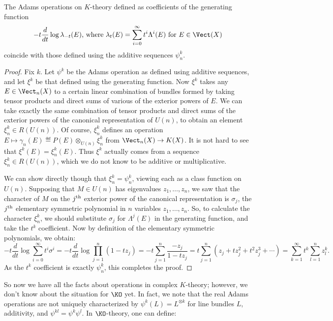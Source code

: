 \begin{claim}
The Adams operations on $K$-theory defined as coefficients of the generating function
\[-t \frac{d}{dt}\log \lambda_{-t}(E)\textup{, where }\lambda_t(E)=\sum_{i=0}^\infty t^i\Lambda^i(E)\text{ for } E\in\Vect(X)\]
coincide with those defined using the additive sequences $\psi^k_n$.
\end{claim}
\begin{proof}
Fix $k$. Let $\psi^k$ be the Adams operation as defined using additive sequences, and let $\xi^k$ be that defined using the generating function. Now $\xi^k$ takes any $E\in\Vect_n(X)$ to a certain linear combination of bundles formed by taking tensor products and direct sums of various of the exterior powers of $E$. We can take exactly the same combination of tensor products and direct sums of the exterior powers of the canonical representation of $U(n)$, to obtain an element $\xi^k_n\in R(U(n))$. Of course, $\xi^k_n$ defines an operation $E\mapsto \gamma_n(E) \eqdef P(E)\otimes_{U(n)}\xi^k_n$ from $\Vect_n(X)\to K(X)$. It is not hard to see that $\xi^k(E)=\xi^k_n(E)$. Thus $\xi^k$ actually comes from a sequence $\xi^k_n\in R(U(n))$, which we do not know to be additive or multiplicative.

We can show directly though that $\xi^k_n=\psi^k_n$, viewing each as a class function on $U(n)$. Supposing that $M\in U(n)$ has eigenvalues $z_1,\ldots,z_n$, we saw that the character of $M$ on the $j^\textup{th}$ exterior power of the canonical representation is $\sigma_j$, the $j^\textup{th}$ elementary symmetric polynomial in $n$ variables $z_1,\ldots,z_n$. So, to calculate the character $\xi^k_n$, we should substitute $\sigma_j$ for $\Lambda^j(E)$ in the generating function, and take the $t^k$ coefficient.
Now by definition of the elementary symmetric polynomials, we obtain:
\[-t\frac{d}{dt}\log\sum_{i=0}^\infty t^i\sigma^i
=-t\frac{d}{dt}\log\prod_{j=1}^n(1-t z_j)=-t\sum_{j=1}^n\frac{-z_j}{1-tz_j}=t\sum_{j=1}^n \left(z_j+tz_j^2+t^2z_j^3+\cdots\right)=\sum_{k=1}^\infty t^k \sum_{l=1}^nz_l^k.\]
As the $t^k$ coefficient is exactly $\psi^k_n$, this completes the proof.
\end{proof}
So now we have all the facts about operations in complex $K$-theory; however, we don't know about the situation for $\KO$ yet.  In fact, we note that the real Adams operations are not uniquely characterized by $\psi^k(L) = L^{\otimes k}$ for line bundles $L$, additivity, and $\psi^{kl} = \psi^k \psi^l$.  In $\KO$-theory, one can define:
